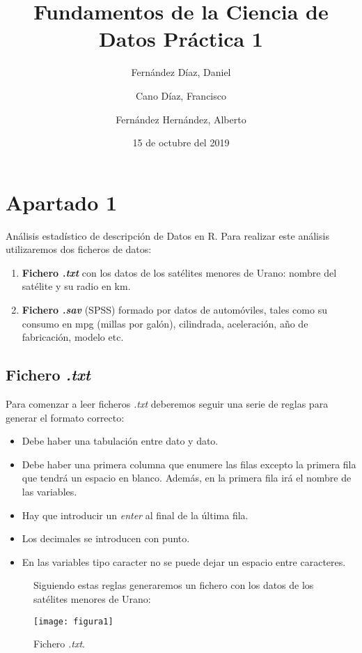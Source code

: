\documentclass [a4paper] {article}
\title{\textbf{Fundamentos de la Ciencia de Datos Práctica 1}}
\author{
	Fernández Díaz, Daniel
	\and
	Cano Díaz, Francisco
	\and
	Fernández Hernández, Alberto
}
\date{15 de octubre del 2019}
\begin{document}
\maketitle
\newpage
\tableofcontents
\newpage

\section{Apartado 1}

Análisis estadístico de descripción de Datos en R. Para realizar este análisis utilizaremos dos ficheros de datos:
\begin{enumerate}
	\item \textbf{Fichero \textit{.txt}} con los datos de los satélites menores de Urano: nombre del satélite y su radio en km.
	\item \textbf{Fichero \textit{.sav}} (SPSS) formado por datos de automóviles, tales como su consumo en mpg (millas por galón), cilindrada, aceleración, año de fabricación, modelo etc.
\end{enumerate}

\subsection{Fichero \textit{.txt}}
Para comenzar a leer ficheros \textit{.txt} deberemos seguir una serie de reglas para generar el formato correcto:
\begin{itemize}
	\item Debe haber una tabulación entre dato y dato.
	\item Debe haber una primera columna que enumere las filas excepto la primera fila que tendrá un espacio en blanco. Además, en la primera fila irá el nombre de las variables.
	\item Hay que introducir un \textit{enter} al final de la última fila.
	\item Los decimales se introducen con punto.
	\item En las variables tipo caracter no se puede dejar un espacio entre caracteres.
\end{itemize}

\begin{figure}[h!]
Siguiendo estas reglas generaremos un fichero con los datos de los satélites menores de Urano:

\centering
\texttt{[image: figura1]}
\caption{Fichero \textit{.txt}.}
\end{figure}
\end{document}
